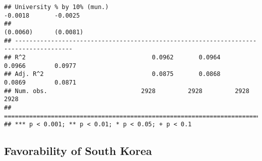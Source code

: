 \documentclass[
]{article}
\begin{document}
\begin{verbatim}
## University % by 10% (mun.)                                     -0.0018       -0.0025  
##                                                                (0.0060)      (0.0081) 
## --------------------------------------------------------------------------------------
## R^2                                   0.0962       0.0964       0.0966        0.0977  
## Adj. R^2                              0.0875       0.0868       0.0869        0.0871  
## Num. obs.                          2928         2928         2928          2928       
## ======================================================================================
## *** p < 0.001; ** p < 0.01; * p < 0.05; + p < 0.1
\end{verbatim}

\hypertarget{favorability-of-south-korea-3}{%
\subsection{Favorability of South
Korea}\label{favorability-of-south-korea-3}}
\end{document}
